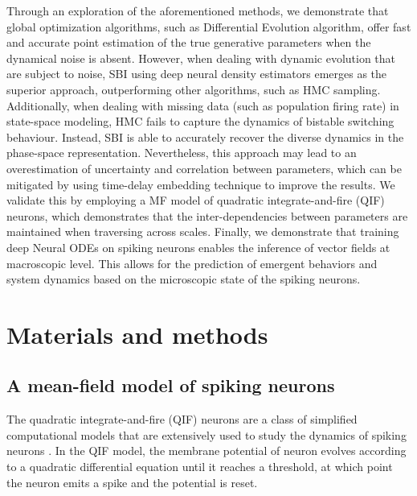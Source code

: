 \documentclass[preprint,11pt,authoryear]{elsarticle}
\begin{document}
Through an exploration of the aforementioned methods, we demonstrate that global optimization algorithms, such as Differential Evolution algorithm, offer fast and accurate point estimation of the true generative parameters when the dynamical noise is absent. However, when dealing with dynamic evolution that are subject to noise, SBI using deep neural density estimators emerges as the superior approach, outperforming other algorithms, such as HMC sampling. Additionally, when dealing with missing data (such as population firing rate) in state-space modeling, HMC fails to capture the dynamics of bistable switching behaviour. Instead, SBI is able to accurately recover the diverse dynamics in the phase-space representation. Nevertheless, this approach may lead to an overestimation of uncertainty and correlation between parameters, which can be mitigated by using time-delay embedding technique to improve the results. We validate this by employing a MF model of quadratic integrate-and-fire (QIF) neurons, which demonstrates that the inter-dependencies between parameters are maintained when traversing across scales. Finally, we demonstrate that training deep Neural ODEs on spiking neurons enables the inference of vector fields at macroscopic level. This allows for the prediction of emergent behaviors and system dynamics based on the microscopic state of the spiking neurons. 




\section{Materials and methods}
\label{Methods}

\subsection{A mean-field model of spiking neurons}

The quadratic integrate-and-fire (QIF) neurons are a class of simplified computational models that are extensively used to study the dynamics of spiking neurons \citep{Gerstner2002, Izhikevich2007}. In the QIF model, the membrane potential of neuron evolves according to a quadratic differential equation until it reaches a threshold, at which point the neuron emits a spike and the potential is reset.
\end{document}
